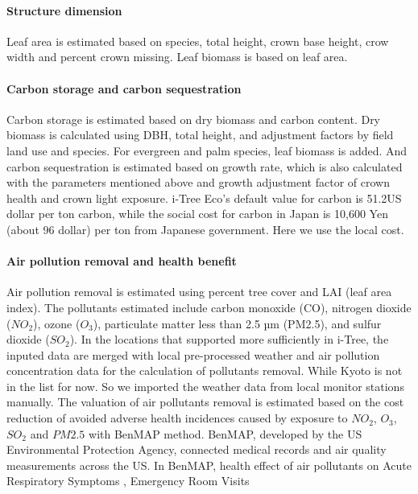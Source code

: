 \documentclass[
]{article}
\begin{document}
\hypertarget{structure-dimension}{%
\paragraph{Structure dimension}\label{structure-dimension}}

Leaf area is estimated based on species, total height, crown base height, crow width and percent crown missing. Leaf biomass is based on leaf area.

\hypertarget{carbon-storage-and-carbon-sequestration}{%
\paragraph{Carbon storage and carbon sequestration}\label{carbon-storage-and-carbon-sequestration}}

Carbon storage is estimated based on dry biomass and carbon content. Dry biomass is calculated using DBH, total height, and adjustment factors by field land use and species. For evergreen and palm species, leaf biomass is added. And carbon sequestration is estimated based on growth rate, which is also calculated with the parameters mentioned above and growth adjustment factor of crown health and crown light exposure.
i-Tree Eco's default value for carbon is 51.2US dollar per ton carbon, while the social cost for carbon in Japan is 10,600 Yen (about 96 dollar) per ton from Japanese government. Here we use the local cost.

\hypertarget{air-pollution-removal-and-health-benefit}{%
\paragraph{Air pollution removal and health benefit}\label{air-pollution-removal-and-health-benefit}}

Air pollution removal is estimated using percent tree cover and LAI (leaf area index). The pollutants estimated include carbon monoxide (CO), nitrogen dioxide (\(NO_2\)), ozone (\(O_3\)), particulate matter less than 2.5 µm (PM2.5),
and sulfur dioxide (\(SO_2\)). In the locations that supported more sufficiently in i-Tree, the inputed data are merged with local pre-processed weather and air pollution concentration data for the calculation of pollutants removal. While Kyoto is not in the list for now. So we imported the weather data from local monitor stations manually.
The valuation of air pollutants removal is estimated based on the cost reduction of avoided adverse health incidences caused by exposure to \(NO_2\), \(O_3\), \(SO_2\) and \(PM2.5\) with BenMAP method. BenMAP, developed by the US Environmental Protection Agency, connected medical records and air quality measurements across the US. In BenMAP, health effect of air pollutants on Acute Respiratory Symptoms , Emergency Room Visits
\end{document}
